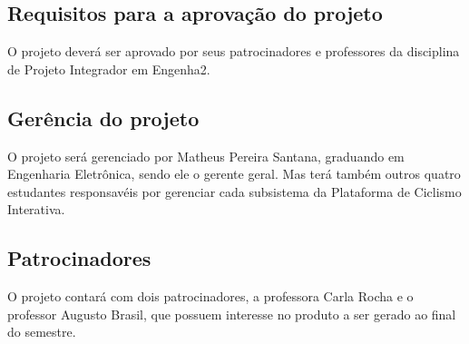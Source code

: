 \begin{apendicesenv}
\subsection{Requisitos para a aprovação do projeto}

O projeto deverá ser aprovado por seus patrocinadores e professores da disciplina de Projeto Integrador em Engenha2.

\subsection{Gerência do projeto}

O projeto será gerenciado por Matheus Pereira Santana, graduando em Engenharia Eletrônica, sendo ele o gerente geral. Mas terá também outros quatro estudantes responsavéis por gerenciar cada subsistema da Plataforma de Ciclismo Interativa.

\subsection{Patrocinadores}

O projeto contará com dois patrocinadores, a professora Carla Rocha e o professor Augusto Brasil, que possuem interesse no produto a ser gerado ao final do semestre. 

\end{apendicesenv}
